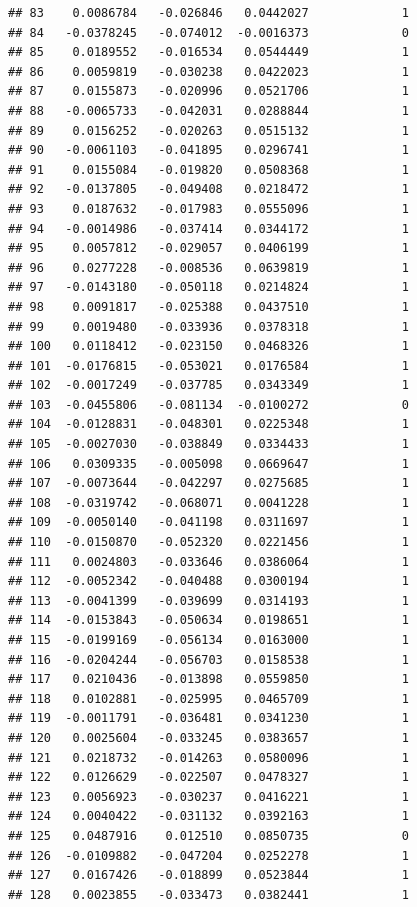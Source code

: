\documentclass[12pt]{article}\usepackage[]{graphicx}\usepackage[]{xcolor}
\makeatletter
\newenvironment{kframe}{%
 \def\at@end@of@kframe{}%
 \ifinner\ifhmode%
  \def\at@end@of@kframe{\end{minipage}}%
  \begin{minipage}{\columnwidth}%
 \fi\fi%
 \def\FrameCommand##1{\hskip\@totalleftmargin \hskip-\fboxsep
 \colorbox{shadecolor}{##1}\hskip-\fboxsep
     \hskip-\linewidth \hskip-\@totalleftmargin \hskip\columnwidth}%
 \MakeFramed {\advance\hsize-\width
   \@totalleftmargin\z@ \linewidth\hsize
   \@setminipage}}%
 {\par\unskip\endMakeFramed%
 \at@end@of@kframe}
\newenvironment{knitrout}{}{} %
\makeatother
\begin{document}
\begin{knitrout}
\begin{kframe}
\begin{verbatim}
## 83    0.0086784   -0.026846   0.0442027             1
## 84   -0.0378245   -0.074012  -0.0016373             0
## 85    0.0189552   -0.016534   0.0544449             1
## 86    0.0059819   -0.030238   0.0422023             1
## 87    0.0155873   -0.020996   0.0521706             1
## 88   -0.0065733   -0.042031   0.0288844             1
## 89    0.0156252   -0.020263   0.0515132             1
## 90   -0.0061103   -0.041895   0.0296741             1
## 91    0.0155084   -0.019820   0.0508368             1
## 92   -0.0137805   -0.049408   0.0218472             1
## 93    0.0187632   -0.017983   0.0555096             1
## 94   -0.0014986   -0.037414   0.0344172             1
## 95    0.0057812   -0.029057   0.0406199             1
## 96    0.0277228   -0.008536   0.0639819             1
## 97   -0.0143180   -0.050118   0.0214824             1
## 98    0.0091817   -0.025388   0.0437510             1
## 99    0.0019480   -0.033936   0.0378318             1
## 100   0.0118412   -0.023150   0.0468326             1
## 101  -0.0176815   -0.053021   0.0176584             1
## 102  -0.0017249   -0.037785   0.0343349             1
## 103  -0.0455806   -0.081134  -0.0100272             0
## 104  -0.0128831   -0.048301   0.0225348             1
## 105  -0.0027030   -0.038849   0.0334433             1
## 106   0.0309335   -0.005098   0.0669647             1
## 107  -0.0073644   -0.042297   0.0275685             1
## 108  -0.0319742   -0.068071   0.0041228             1
## 109  -0.0050140   -0.041198   0.0311697             1
## 110  -0.0150870   -0.052320   0.0221456             1
## 111   0.0024803   -0.033646   0.0386064             1
## 112  -0.0052342   -0.040488   0.0300194             1
## 113  -0.0041399   -0.039699   0.0314193             1
## 114  -0.0153843   -0.050634   0.0198651             1
## 115  -0.0199169   -0.056134   0.0163000             1
## 116  -0.0204244   -0.056703   0.0158538             1
## 117   0.0210436   -0.013898   0.0559850             1
## 118   0.0102881   -0.025995   0.0465709             1
## 119  -0.0011791   -0.036481   0.0341230             1
## 120   0.0025604   -0.033245   0.0383657             1
## 121   0.0218732   -0.014263   0.0580096             1
## 122   0.0126629   -0.022507   0.0478327             1
## 123   0.0056923   -0.030237   0.0416221             1
## 124   0.0040422   -0.031132   0.0392163             1
## 125   0.0487916    0.012510   0.0850735             0
## 126  -0.0109882   -0.047204   0.0252278             1
## 127   0.0167426   -0.018899   0.0523844             1
## 128   0.0023855   -0.033473   0.0382441             1

\end{verbatim}
\end{kframe}
\end{knitrout}
\end{document}
